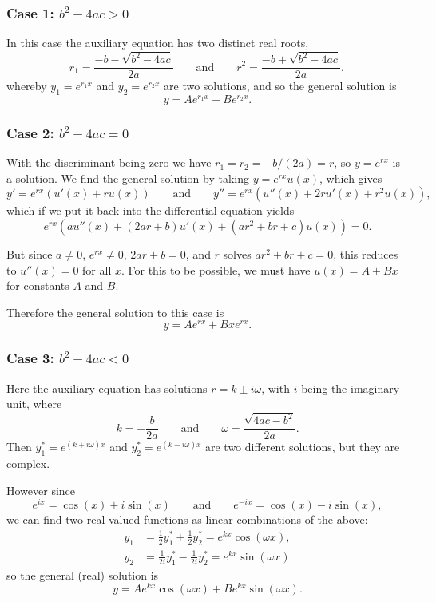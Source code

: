 \subsubsection*{Case 1: $b^2 - 4 a c > 0$}

In this case the auxiliary equation has two distinct real roots,
\[
	r_1 = \frac{- b - \sqrt{b^2 - 4 a c}}{2 a} \qquad \text{and} \qquad r^2 = \frac{- b + \sqrt{b^2 - 4 a c}}{2 a},
\]
whereby $y_1 = e^{r_1 x}$ and $y_2 = e^{r_2 x}$ are two solutions, and so the general solution is
\[
	y = A e^{r_1 x} + B e^{r_2 x}.
\]

\subsubsection*{Case 2: $b^2 - 4 a c = 0$}

With the discriminant being zero we have $r_1 = r_2 = -b / (2a) = r$, so $y = e^{r x}$ is a solution.
We find the general solution by taking $y = e^{r x} u(x)$, which gives
\[
	y' = e^{r x} (u'(x) + r u(x)) \qquad \text{and} \qquad y'' = e^{r x} (u''(x) + 2 r u'(x) + r^2 u(x)),
\]
which if we put it back into the differential equation yields
\[
	e^{r x} (a u''(x) + (2 a r + b) u'(x) + (a r^2 + b r + c) u(x)) = 0.
\]

\noindent
But since $a \neq 0$, $e^{r x} \neq 0$, $2 a r + b = 0$, and $r$ solves $a r^2 + b r + c = 0$, this reduces to $u''(x) = 0$ for all $x$.
For this to be possible, we must have $u(x) = A + B x$ for constants $A$ and $B$.

Therefore the general solution to this case is
\[
	y = A e^{r x} + B x e^{r x}.
\]

\subsubsection*{Case 3: $b^2 - 4 a c < 0$}

Here the auxiliary equation has solutions $r = k \pm i \omega$, with $i$ being the imaginary unit, where
\[
	k = - \frac{b}{2 a} \qquad \text{and} \qquad \omega = \frac{\sqrt{4 a c - b^2}}{2 a}.
\]
Then $y_1^* = e^{(k + i \omega) x}$ and $y_2^* = e^{(k - i \omega) x}$ are two different solutions, but they are complex.

However since
\[
	e^{i x} = \cos(x) + i \sin(x) \qquad \text{and} \qquad e^{- i x} = \cos(x) - i \sin(x),
\]
we can find two real-valued functions as linear combinations of the above:
\begin{align*}
	y_1 &= \frac{1}{2} y_1^* + \frac{1}{2} y_2^* = e^{k x} \cos(\omega x), \\
	y_2 &= \frac{1}{2 i} y_1^* - \frac{1}{2 i} y_2^* = e^{k x} \sin(\omega x)
\end{align*}
so the general (real) solution is
\[
	y = A e^{k x} \cos(\omega x) + B e^{k x} \sin(\omega x).
\]

